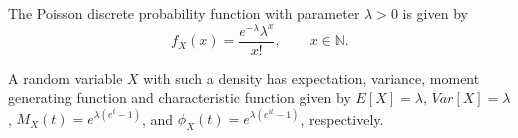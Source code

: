\documentclass[12pt]{article}
\begin{document}

The Poisson discrete probability function with parameter $\lambda>0$ is given by  $$f_X(x) = \frac{e^{-\lambda} \lambda^x}{x!},\quad\quad     x\in \mathbb{N}.$$

A random variable $X$ with such a density has expectation, variance, moment generating function and characteristic function given by $E[X] = \lambda$,  $Var[X] = \lambda$, $M_X(t) = e^{\lambda (e^t - 1)}$, and $\phi_X(t) = e^{\lambda(e^{it}-1)}$, respectively.
\end{document}
